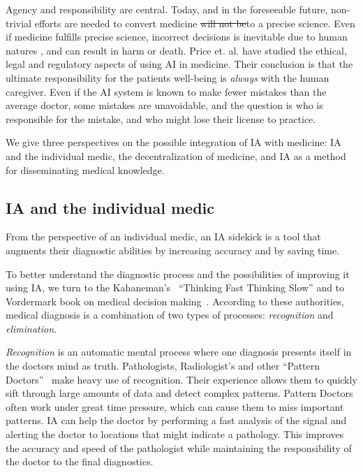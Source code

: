 \documentclass[11pt]{pnas-new}
\begin{document}
Agency and responsibility are central. Today, and in the foreseeable
future, {\color{blue}non-trivial efforts are needed to convert} medicine \sout{will not be}{\color{blue}to} a precise science. {\color{blue}Even if medicine fulfills precise science,} incorrect decisions {\color{blue}is inevitable due to human natures \cite{donaldson2000err}, and }
can result in harm or death.  Price et. al. have studied the ethical,
legal and regulatory aspects of using AI in
medicine.\cite{price2014black,ford2016privacy, ford2017regulating}
Their conclusion is that the ultimate responsibility for the patients
well-being is {\em always} with the human caregiver. Even if the AI
system is known to make fewer mistakes than the average doctor, some
mistakes are unavoidable, and the question is who is responsible for
the mistake, and who might lose their license to practice.

We give three perspectives on the possible integration of IA with
medicine: IA and the individual medic, the decentralization of
medicine, and IA as a method for disseminating medical knowledge.

\subsection{IA and the individual medic}

 
From the perspective of an individual medic, an IA sidekick is a
tool that augments their diagnostic abilities by increasing accuracy
and by saving time.

To better understand the diagnostic process and the possibilities  of
improving it using IA, we turn to the Kahaneman's~\cite{kahneman2011thinking}
``Thinking Fast Thinking Slow'' and to Vordermark book on medical
decision making~\cite{vordermark2019introduction}. According to these authorities,
medical diagnosis is a combination of two types of processes: {\em
  recognition} and {\em elimination}.

{\em Recognition} is an automatic mental process where one diagnosis
presents itself in the doctors mind as truth. Pathologists,
Radiologist's and other ``Pattern Doctors''~\cite{Topol} make heavy use
of recognition. Their experience allows them to quickly sift through
large amounts of data and detect complex patterns. Pattern Doctors
often work under great time pressure, which can cause them to miss
important patterns. IA can help the doctor by performing a fast
analysis of the signal and alerting the doctor to locations that might
indicate a pathology. This improves the accuracy and speed of the
pathologist while maintaining the responsibility of the doctor to the
final diagnostics. 
\end{document}

